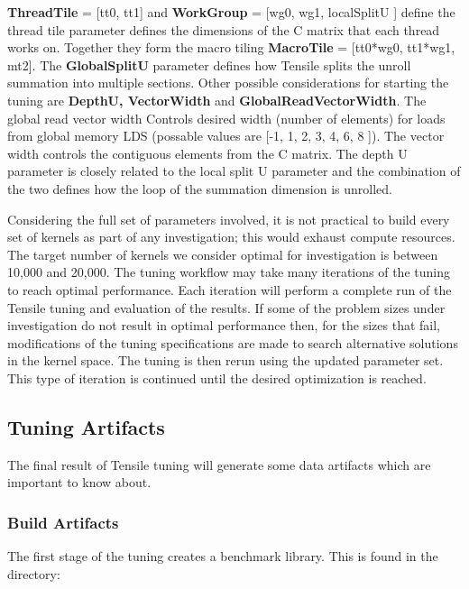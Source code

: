 \documentclass[]{article}
\begin{document}
{\color{ForestGreen} \bf ThreadTile} = [tt0, tt1] and {\color{ForestGreen} \bf  WorkGroup} = [wg0, wg1, localSplitU ] define the thread tile parameter defines the dimensions of the C matrix that each thread works on. Together they form the macro tiling {\color{ForestGreen} \bf MacroTile} = [tt0*wg0, tt1*wg1, mt2]. The {\color{ForestGreen} \bf GlobalSplitU} parameter defines how Tensile splits the unroll summation into multiple sections. Other possible considerations for starting the tuning are {\color{ForestGreen} \bf DepthU, VectorWidth} and {\color{ForestGreen} \bf GlobalReadVectorWidth}. The global read vector width Controls desired width (number of elements) for loads from global memory LDS (possable values are [-1, 1, 2, 3, 4, 6, 8 ]). The vector width controls the contiguous elements from the C matrix. The depth U parameter is closely related to the local split U parameter and the combination of the two defines how the loop of the summation dimension is unrolled.

Considering the full set of parameters involved, it is not practical to build every set of kernels as part of any investigation; this would exhaust compute resources. The target number of kernels we consider optimal for investigation is between 10,000 and 20,000. The tuning workflow may take many iterations of the tuning to reach optimal performance. Each iteration will perform a complete run of the Tensile tuning and evaluation of the results. If some of the problem sizes under investigation do not result in optimal performance then, for the sizes that fail, modifications of the tuning specifications are made to search alternative solutions in the kernel space. The tuning is then rerun using the updated parameter set. This type of iteration is continued until the desired optimization is reached.

\subsection{Tuning Artifacts}
The final result of Tensile tuning will generate some data artifacts which are important to know about. 

\subsubsection{Build Artifacts}
The first stage of the tuning creates a benchmark library. This is found in the directory:
 
\end{document}
